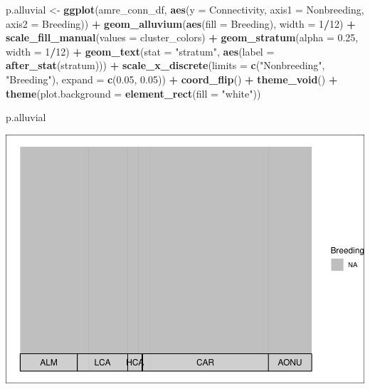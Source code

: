 \documentclass[
]{book}
\newenvironment{Shaded}{\begin{snugshade}}{\end{snugshade}}
\newcommand{\AttributeTok}[1]{\textcolor[rgb]{0.13,0.29,0.53}{#1}}
\newcommand{\DecValTok}[1]{\textcolor[rgb]{0.00,0.00,0.81}{#1}}
\newcommand{\FloatTok}[1]{\textcolor[rgb]{0.00,0.00,0.81}{#1}}
\newcommand{\FunctionTok}[1]{\textcolor[rgb]{0.13,0.29,0.53}{\textbf{#1}}}
\newcommand{\NormalTok}[1]{#1}
\newcommand{\OtherTok}[1]{\textcolor[rgb]{0.56,0.35,0.01}{#1}}
\newcommand{\SpecialCharTok}[1]{\textcolor[rgb]{0.81,0.36,0.00}{\textbf{#1}}}
\newcommand{\StringTok}[1]{\textcolor[rgb]{0.31,0.60,0.02}{#1}}
\begin{document}
\begin{Shaded}
\begin{Highlighting}[]
\NormalTok{p.alluvial }\OtherTok{\textless{}{-}} \FunctionTok{ggplot}\NormalTok{(amre\_conn\_df,}
       \FunctionTok{aes}\NormalTok{(}\AttributeTok{y =}\NormalTok{ Connectivity, }\AttributeTok{axis1 =}\NormalTok{ Nonbreeding, }\AttributeTok{axis2 =}\NormalTok{ Breeding)) }\SpecialCharTok{+}
  \FunctionTok{geom\_alluvium}\NormalTok{(}\FunctionTok{aes}\NormalTok{(}\AttributeTok{fill =}\NormalTok{ Breeding), }\AttributeTok{width =} \DecValTok{1}\SpecialCharTok{/}\DecValTok{12}\NormalTok{) }\SpecialCharTok{+}
  \FunctionTok{scale\_fill\_manual}\NormalTok{(}\AttributeTok{values =}\NormalTok{ cluster\_colors) }\SpecialCharTok{+}
  \FunctionTok{geom\_stratum}\NormalTok{(}\AttributeTok{alpha =} \FloatTok{0.25}\NormalTok{, }\AttributeTok{width =} \DecValTok{1}\SpecialCharTok{/}\DecValTok{12}\NormalTok{) }\SpecialCharTok{+}
  \FunctionTok{geom\_text}\NormalTok{(}\AttributeTok{stat =} \StringTok{"stratum"}\NormalTok{, }\FunctionTok{aes}\NormalTok{(}\AttributeTok{label =} \FunctionTok{after\_stat}\NormalTok{(stratum))) }\SpecialCharTok{+}
  \FunctionTok{scale\_x\_discrete}\NormalTok{(}\AttributeTok{limits =} \FunctionTok{c}\NormalTok{(}\StringTok{"Nonbreeding"}\NormalTok{, }\StringTok{"Breeding"}\NormalTok{),}
                   \AttributeTok{expand =} \FunctionTok{c}\NormalTok{(}\FloatTok{0.05}\NormalTok{, }\FloatTok{0.05}\NormalTok{)) }\SpecialCharTok{+} 
  \FunctionTok{coord\_flip}\NormalTok{() }\SpecialCharTok{+}
  \FunctionTok{theme\_void}\NormalTok{() }\SpecialCharTok{+}
  \FunctionTok{theme}\NormalTok{(}\AttributeTok{plot.background =} \FunctionTok{element\_rect}\NormalTok{(}\AttributeTok{fill =} \StringTok{"white"}\NormalTok{))}

\NormalTok{p.alluvial}
\end{Highlighting}
\end{Shaded}

\includegraphics{Mignette_files/figure-latex/unnamed-chunk-23-1.pdf}
\end{document}
